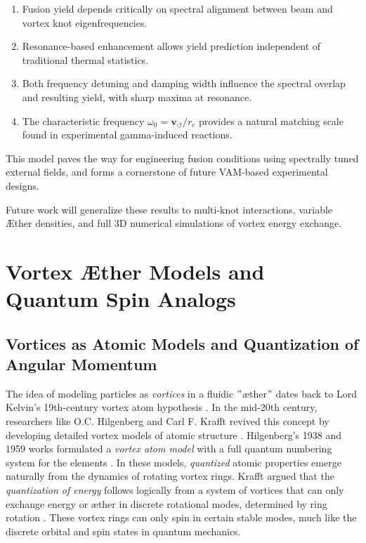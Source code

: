 \documentclass[a4paper, aps,preprint,superscriptaddress, 12pt]{revtex4}
\begin{document}
\begin{enumerate}
  \item Fusion yield depends critically on spectral alignment between beam and vortex knot eigenfrequencies.
  \item Resonance-based enhancement allows yield prediction independent of traditional thermal statistics.
  \item Both frequency detuning and damping width influence the spectral overlap and resulting yield, with sharp maxima at resonance.
  \item The characteristic frequency \( \omega_0 = \mathbf{v}_{\scriptscriptstyle\boldsymbol{\circlearrowleft}} / r_c \) provides a natural matching scale found in experimental gamma-induced reactions.
\end{enumerate}

This model paves the way for engineering fusion conditions using spectrally tuned external fields, and forms a cornerstone of future VAM-based experimental designs.

Future work will generalize these results to multi-knot interactions, variable Æther densities, and full 3D numerical simulations of vortex energy exchange.
\chapter*{Vortex Æther Models and Quantum Spin Analogs}


\section*{Vortices as Atomic Models and Quantization of Angular Momentum}

The idea of modeling particles as \textit{vortices} in a fluidic \("\)æther\("\) dates back to Lord Kelvin's 19th-century vortex atom hypothesis \cite{Dennis2020}. In the mid-20th century, researchers like O.C. Hilgenberg and Carl F. Krafft revived this concept by developing detailed vortex models of atomic structure \cite{Hilgenberg1938, KrafftEtherMatter}. Hilgenberg's 1938 and 1959 works formulated a \textit{vortex atom model} with a full quantum numbering system for the elements \cite{ReichBlackSun}. In these models, \textit{quantized} atomic properties emerge naturally from the dynamics of rotating vortex rings. Krafft argued that the \textit{quantization of energy} follows logically from a system of vortices that can only exchange energy or æther in discrete rotational modes, determined by ring rotation \cite{PadrakINE9}. These vortex rings can only spin in certain stable modes, much like the discrete orbital and spin states in quantum mechanics.
\end{document}
